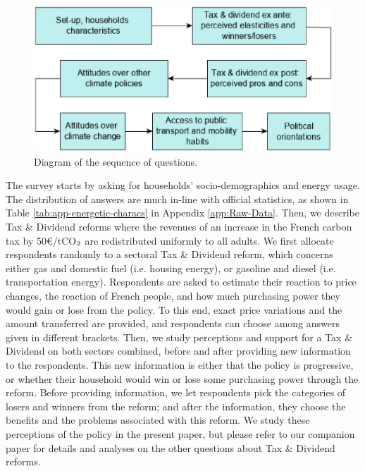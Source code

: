 \documentclass[english,5p,authoryear]{elsarticle}
\begin{document}
\begin{figure}[!htbp]
\centering
\includegraphics[width=\columnwidth]{Images_EPS/diagram_survey_attitudes.eps}
\caption{Diagram of the sequence of questions.}
\label{fig:survey}
\end{figure}
The survey starts by asking for households' socio-demographics and energy usage. The distribution of answers are much in-line with official statistics, as shown in Table \ref{tab:app-energetic-characs} in Appendix \ref{app:Raw-Data}. Then, we describe Tax \& Dividend reforms where the revenues of an increase in the French carbon tax by 50\euro{}/tCO$_\textnormal{2}$ are redistributed uniformly to all adults. We first allocate respondents randomly to a sectoral Tax \& Dividend reform, which concerns either gas and domestic fuel (i.e. housing energy), or gasoline and diesel (i.e. transportation energy). Respondents are asked to estimate their reaction to price changes, the reaction of French people, and how much purchasing power they would gain or lose from the policy. To this end, exact price variations and the amount transferred are provided, and respondents can choose among answers given in different brackets. Then, we study perceptions and support for a Tax \& Dividend on both sectors combined, before and after providing new information to the respondents. This new information is either that the policy is progressive, or whether their household would win or lose some purchasing power through the reform. Before providing information, we let respondents pick the categories of losers and winners from the reform; and after the information, they choose the benefits and the problems associated with this reform. We study these perceptions of the policy in the present paper, but please refer to our companion paper \citep{douenne_can_2019} for details and analyses on the other questions about Tax \& Dividend reforms. %
\end{document}
